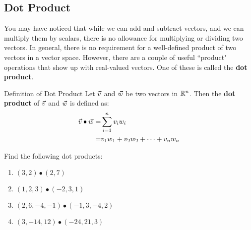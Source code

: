 \subsection{Dot Product}

You may have noticed that while we can add and subtract vectors, and we can multiply them by scalars, there is no allowance for multiplying or dividing two vectors. In general, there is no requirement for a well-defined product of two vectors in a vector space. However, there are a couple of useful ``product" operations that show up with real-valued vectors. One of these is called the \textbf{dot product}.

\begin{definition}{Definition of Dot Product}
Let $\vec{v}$ and $\vec{w}$ be two vectors in $\mathbb{R}^n$. Then the \textbf{dot product} of $\vec{v}$ and $\vec{w}$ is defined as:
\begin{align*}
\vec{v}\bullet\vec{w}=&\sum_{i=1}^n v_i w_i \\
=&v_1 w_1 + v_2 w_2 +\cdots+v_n w_n 
\end{align*}
\end{definition}

\begin{exercise}{}
Find the following dot products:
\begin{enumerate}
\item $(3,2)\bullet(2,7)$
\vspace{1em}
\item $(1,2,3)\bullet(-2,3,1) $
\vspace{1em}
\item $(2,6,-4,-1)\bullet(-1,3,-4,2)$
\vspace{1em}
\item $(3,-14,12)\bullet(-24,21,3)$
\vspace{1em}
\end{enumerate}
\end{exercise}



